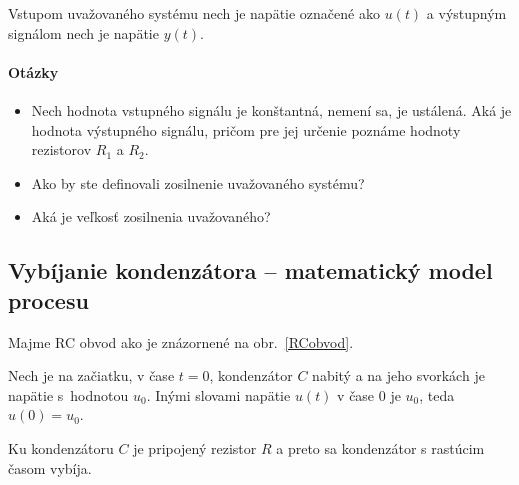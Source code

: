 \documentclass[a4paper, 10pt, ]{article}
\begin{document}

% 	




Vstupom uvažovaného systému nech je napätie označené ako $u(t)$ a výstupným signálom nech je napätie $y(t)$.


\paragraph{Otázky}
\begin{itemize}[leftmargin=0pt, labelsep=4mm, itemsep=0pt]

	\item Nech hodnota vstupného signálu je konštantná, nemení sa, je ustálená. Aká je hodnota výstupného signálu, pričom pre jej určenie poznáme hodnoty rezistorov $R_1$ a $R_2$.

    \item Ako by ste definovali zosilnenie uvažovaného systému?

    \item Aká je veľkosť zosilnenia uvažovaného?

\end{itemize}



\subsection{Vybíjanie kondenzátora -- matematický model procesu}
\label{castVybij}

Majme RC obvod ako je znázornené na obr.~\ref{RCobvod}.

\begin{center}

	\makebox[\textwidth][c]{%
	
	}

	\label{RCobvod}
\end{center}

Nech je na začiatku, v čase $t=0$, kondenzátor $C$ nabitý a na jeho svorkách je napätie s~hodnotou $u_0$. Inými slovami napätie $u(t)$ v čase $0$ je $u_0$, teda $u(0) = u_0$.

Ku kondenzátoru $C$ je pripojený rezistor $R$ a preto sa kondenzátor s rastúcim časom vybíja.
\end{document}
